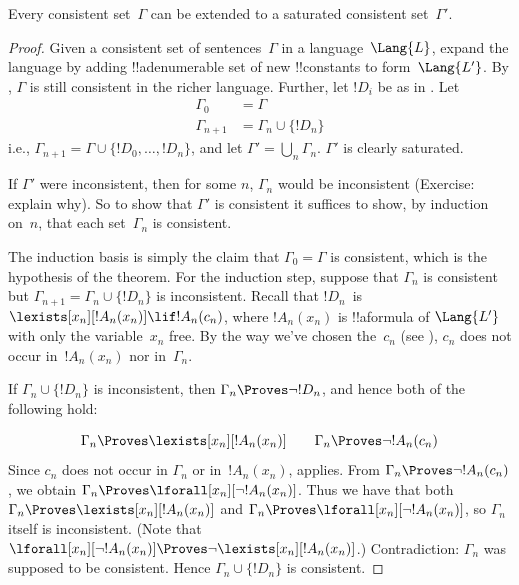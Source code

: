 \begin{lem}
Every consistent set~$\Gamma$ can be extended to a saturated
consistent set~$\Gamma'$.
\end{lem}

\begin{proof}
Given a consistent set of sentences~$\Gamma$ in a language~$\Lang{L}$,
expand the language by adding !!a{denumerable} set of new
!!{constant}s to form~$\Lang{L'}$.  By , $\Gamma$
is still consistent in the richer language.  Further, let $!D_i$ be as
in .  Let
\begin{align*}
\Gamma_0 & = \Gamma \\
\Gamma_{n+1} & = \Gamma_n \cup \{!D_n \}
\end{align*}
i.e., $\Gamma_{n+1} = \Gamma \cup \{ !D_0, \dots, !D_n \}$, and let
$\Gamma' = \bigcup_{n} \Gamma_n$.  $\Gamma'$ is clearly saturated.

If $\Gamma'$ were inconsistent, then for some $n$, $\Gamma_n$ would be
inconsistent (Exercise: explain why).  So to show that $\Gamma'$ is
consistent it suffices to show, by induction on~$n$, that each
set~$\Gamma_n$ is consistent.

The induction basis is simply the claim that $\Gamma_0 = \Gamma$ is
consistent, which is the hypothesis of the theorem.  For the induction
step, suppose that $\Gamma_{n}$ is consistent but $\Gamma_{n+1} =
\Gamma_n \cup \{!D_n\}$ is inconsistent.  Recall that $!D_n$~is
$\lexists[x_{n}][!A_{n}(x_n)] \lif !A_{n}(c_{n})$,
where $!A_n(x_n)$ is !!a{formula} of $\Lang{L'}$ with only the
variable~$x_n$ free. By the way we've chosen the~$c_n$ (see
), $c_n$ does not occur in~$!A_n(x_n)$ nor
in~$\Gamma_n$.

If $\Gamma_n \cup \{!D_n\}$ is inconsistent, then $\Gamma_n
\Proves \lnot !D_n$, and hence both of the following hold:

\[
\Gamma_n \Proves \lexists[x_n][!A_n(x_n)]
\qquad
\Gamma_n \Proves \lnot !A_n(c_n)
\]
Since $c_n$ does not occur in
$\Gamma_n$ or in~$!A_n(x_n)$, 
 applies.
From $\Gamma_n \Proves \lnot !A_n(c_n)$,
we obtain
$\Gamma_n \Proves \lforall[x_n][\lnot !A_n(x_n)]$.
Thus we have that both
$\Gamma_n \Proves \lexists[x_n][!A_n(x_n)]$ and
$\Gamma_n \Proves \lforall[x_n][\lnot !A_n(x_n)]$,
so $\Gamma_n$ itself is inconsistent.
(Note that
$\lforall[x_n][\lnot !A_n(x_n)] \Proves
  \lnot\lexists[x_n][!A_n(x_n)]$.)
Contradiction: $\Gamma_n$ was supposed to be consistent.  Hence
$\Gamma_n \cup \{ !D_n\}$ is consistent.
\end{proof}

